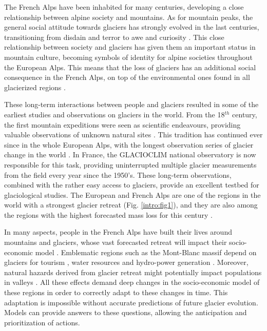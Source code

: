 The French Alps have been inhabited for many centuries, developing a close relationship between alpine society and mountains. As for mountain peaks, the general social attitude towards glaciers has strongly evolved in the last centuries, transitioning from disdain and terror to awe and curiosity \citep{zryd_les_2008}. This close relationship between society and glaciers has given them an important status in mountain culture, becoming symbols of identity for alpine societies throughout the European Alps. This means that the loss of glaciers has an additional social consequence in the French Alps, on top of the environmental ones found in all glacierized regions \citep{smit_exploring_2019}. 

These long-term interactions between people and glaciers resulted in some of the earliest studies and observations on glaciers in the world. From the 18$^{th}$ century, the first mountain expeditions were seen as scientific endeavours, providing valuable observations of unknown natural sites \citep{richalet_scientific_2001}. This tradition has continued ever since in the whole European Alps, with the longest observation series of glacier change in the world \citep{glamos_swiss_2019}. In France, the GLACIOCLIM national observatory is now responsible for this task, providing uninterrupted multiple glacier measurements from the field every year since the 1950's. These long-term observations, combined with the rather easy access to glaciers, provide an excellent testbed for glaciological studies. The European and French Alps are one of the regions in the world with a strongest glacier retreat (Fig. \ref{intro:fig1}), and they are also among the regions with the highest forecasted mass loss for this century \citep{marzeion_partitioning_2020}.

In many aspects, people in the French Alps have built their lives around mountains and glaciers, whose vast forecasted retreat will impact their socio-economic model \citep{mourey_evolution_2017, spandre_winter_2019}. Emblematic regions such as the Mont-Blanc massif depend on glaciers for tourism \citep{schut_sport_2013, spandre_climate_2019}, water resources and hydro-power generation  \citep{laurent_impact_2020}. Moreover, natural hazards derived from glacier retreat might potentially impact populations in valleys \citep{magnin_estimating_2020}. All these effects demand deep changes in the socio-economic model of these regions in order to correctly adapt to these changes in time. This adaptation is impossible without accurate predictions of future glacier evolution. Models can provide answers to these questions, allowing the anticipation and prioritization of actions.

